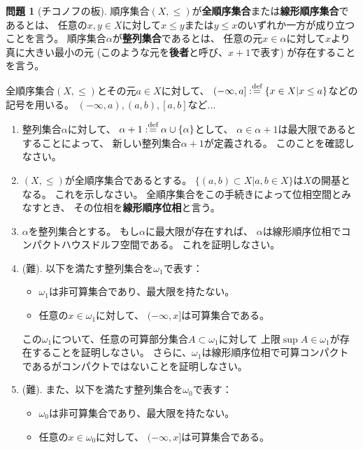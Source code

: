 \documentclass[uplatex]{jsarticle}
\theoremstyle{definition}
\newtheorem{prob}[prob]{問題}
\newcommand{\dfn}{:\overset{\mbox{{\scriptsize def}}}{=}}
\begin{document}
\begin{prob}[チコノフの板]\label{Tychonoff plank}
  順序集合\((X,\leq)\)が\textbf{全順序集合}または\textbf{線形順序集合}であるとは、
  任意の\(x,y\in X\)に対して\(x\leq y\)または\(y\leq x\)のいずれか一方が成り立つことを言う。
  順序集合\(\alpha\)が\textbf{整列集合}であるとは、
  任意の元\(x\in \alpha\)に対して\(x\)より真に大きい最小の元
  (このような元を\textbf{後者}と呼び、\(x+1\)で表す)
  が存在することを言う。

  全順序集合\((X,\leq)\)とその元\(a\in X\)に対して、
  \((-\infty,a]\dfn \{x\in X|x\leq a\}\)などの記号を用いる。
  \((-\infty,a),(a,b),[a,b]\)など...
  \begin{enumerate}
    \item
    整列集合\(\alpha\)に対して、
    \(\alpha + 1 \dfn \alpha \cup \{\alpha\}\)として、
    \(\alpha\in \alpha + 1\)は最大限であるとすることによって、
    新しい整列集合\(\alpha + 1\)が定義される。
    このことを確認しなさい。
    \item
    \((X,\leq)\)が全順序集合であるとする。
    \(\{(a,b)\subset X|a,b\in X\}\)は\(X\)の開基となる。
    これを示しなさい。
    全順序集合をこの手続きによって位相空間とみなすとき、
    その位相を\textbf{線形順序位相}と言う。
    \item
    \(\alpha\)を整列集合とする。
    もし\(\alpha\)に最大限が存在すれば、
    \(\alpha\)は線形順序位相でコンパクトハウスドルフ空間である。
    これを証明しなさい。
    \item \label{omega1}
    (難).
    以下を満たす整列集合を\(\omega_1\)で表す：
    \begin{itemize}
      \item \(\omega_1\)は非可算集合であり、最大限を持たない。
      \item 任意の\(x\in \omega_1\)に対して、
      \((-\infty,x]\)は可算集合である。
    \end{itemize}
    この\(\omega_1\)について、任意の可算部分集合\(A\subset \omega_1\)に対して
    上限\(\sup A\in \omega_1\)が存在することを証明しなさい。
    さらに、\(\omega_1\)は線形順序位相で可算コンパクトであるがコンパクトではないことを証明しなさい。
    \item (難).
    また、以下を満たす整列集合を\(\omega_0\)で表す：
    \begin{itemize}
      \item \(\omega_0\)は非可算集合であり、最大限を持たない。
      \item 任意の\(x\in \omega_0\)に対して、
      \((-\infty,x]\)は可算集合である。
    \end{itemize}

\end{enumerate}
\end{prob}
\end{document}
